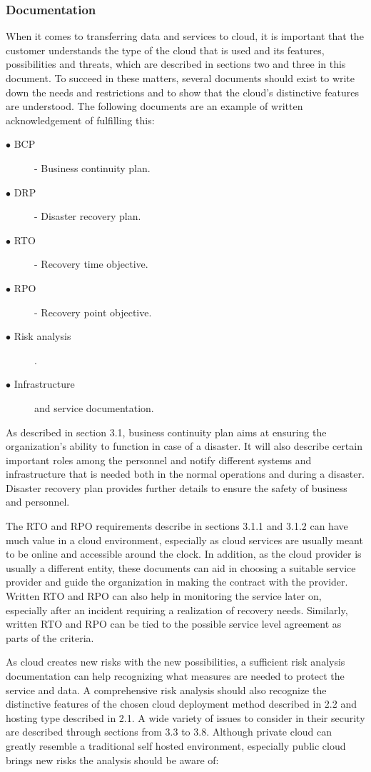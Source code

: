 \documentclass{article}
\begin{document}
\subsubsection{Documentation}
When it comes to transferring data and services to cloud, it is important that the customer understands the type of the cloud that is used and its features, possibilities and threats, which are described in sections two and three in this document. To succeed in these matters, several documents should exist to write down the needs and restrictions and to show that the cloud's distinctive features are understood. The following documents are an example of written acknowledgement of fulfilling this:
\begin{description}
	\item[$\bullet$ BCP] - Business continuity plan.
	\item[$\bullet$ DRP] - Disaster recovery plan.
	\item[$\bullet$ RTO] - Recovery time objective.
	\item[$\bullet$ RPO] - Recovery point objective.
	\item[$\bullet$ Risk analysis].
	\item[$\bullet$ Infrastructure] and service documentation.
\end{description}
\par
As described in section 3.1, business continuity plan aims at ensuring the organization's ability to function in case of a disaster. It will also describe certain important roles among the personnel and notify different systems and infrastructure that is needed both in the normal operations and during a disaster. Disaster recovery plan provides further details to ensure the safety of business and personnel.
\par
The RTO and RPO requirements describe in sections 3.1.1 and 3.1.2 can have much value in a cloud environment, especially as cloud services are usually meant to be online and accessible around the clock. In addition,  as the cloud provider is usually a different entity, these documents can aid in choosing a suitable service provider and guide the organization in making the contract with the provider. Written RTO and RPO can also help in monitoring the service later on, especially after an incident requiring a realization of recovery needs. Similarly, written RTO and RPO can be tied to the possible service level agreement as parts of the criteria.
\par
As cloud creates new risks with the new possibilities, a sufficient risk analysis documentation can help recognizing what measures are needed to protect the service and data. A comprehensive risk analysis should also recognize the distinctive features of the chosen cloud deployment method described in 2.2 and hosting type described in 2.1. A wide variety of issues to consider in their security are described through sections from 3.3 to 3.8. Although private cloud can greatly resemble a traditional self hosted environment, especially public cloud brings new risks the analysis should be aware of:
\end{document}
